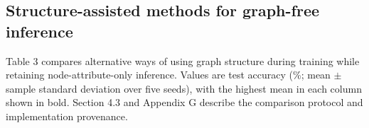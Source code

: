 \documentclass[10pt,letterpaper]{elsarticle}
\newlength{\TableWidth}
\begin{document}
\Needspace{344pt}

\subsection{Structure-assisted methods for graph-free inference}\label{sec:5.2}

Table 3 compares alternative ways of using graph structure during training while retaining node-attribute-only inference. Values are test accuracy (\%; mean \ensuremath{\pm} sample standard deviation over five seeds), with the highest mean in each column shown in bold. Section 4.3 and Appendix G describe the comparison protocol and implementation provenance.

\Needspace{269pt}
\begingroup
\fontsize{9}{11}\selectfont
\setlength{\tabcolsep}{3pt}
\renewcommand{\arraystretch}{1.18}
\setlength{\TableWidth}{\dimexpr\linewidth-12\tabcolsep\relax}
\end{document}
